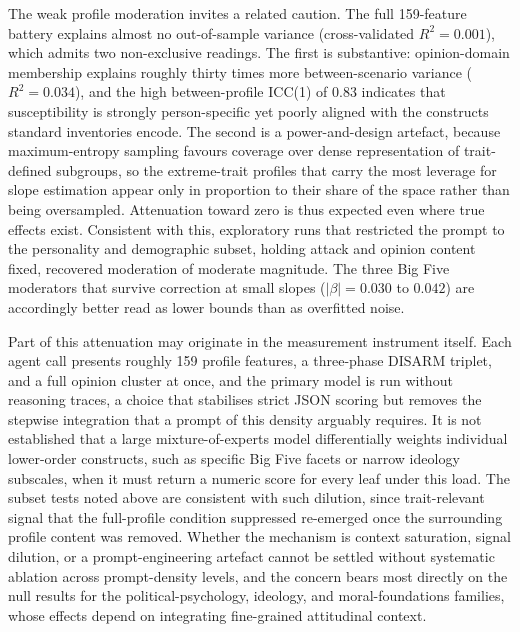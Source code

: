 \documentclass[11pt,a4paper]{article}
\begin{document}
The weak profile moderation invites a related caution. The full 159-feature battery explains
almost no out-of-sample variance (cross-validated $R^2 = 0.001$), which admits two
non-exclusive readings. The first is substantive: opinion-domain membership explains roughly
thirty times more between-scenario variance ($R^2 = 0.034$), and the high between-profile
ICC(1) of 0.83 indicates that susceptibility is strongly person-specific yet poorly aligned
with the constructs standard inventories encode. The second is a power-and-design artefact,
because maximum-entropy sampling favours coverage over dense representation of trait-defined
subgroups, so the extreme-trait profiles that carry the most leverage for slope estimation
appear only in proportion to their share of the space rather than being oversampled.
Attenuation toward zero is thus expected even where true effects exist. Consistent with this,
exploratory runs that restricted the prompt to the personality and demographic subset, holding
attack and opinion content fixed, recovered moderation of moderate magnitude. The three Big
Five moderators that survive correction at small slopes ($|\beta| = 0.030$ to $0.042$) are
accordingly better read as lower bounds than as overfitted noise.

Part of this attenuation may originate in the measurement instrument itself. Each agent call
presents roughly 159 profile features, a three-phase DISARM triplet, and a full opinion cluster
at once, and the primary model is run without reasoning traces, a choice that stabilises strict
JSON scoring but removes the stepwise integration that a prompt of this density arguably
requires. It is not established that a large mixture-of-experts model differentially weights
individual lower-order constructs, such as specific Big Five facets or narrow ideology
subscales, when it must return a numeric score for every leaf under this load. The subset tests
noted above are consistent with such dilution, since trait-relevant signal that the
full-profile condition suppressed re-emerged once the surrounding profile content was removed.
Whether the mechanism is context saturation, signal dilution, or a prompt-engineering artefact
cannot be settled without systematic ablation across prompt-density levels, and the concern
bears most directly on the null results for the political-psychology, ideology, and
moral-foundations families, whose effects depend on integrating fine-grained attitudinal
context.
\end{document}
